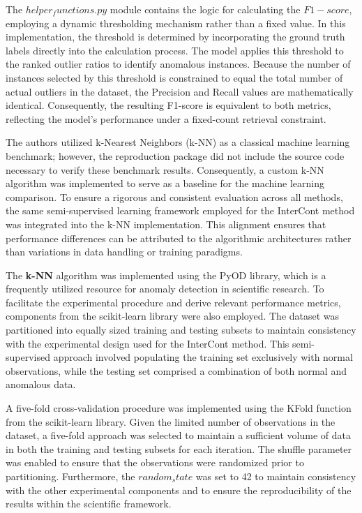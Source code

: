The $helper_functions.py$ module contains the logic for calculating the $F1-score$, employing a dynamic thresholding mechanism rather than a fixed value. 
In this implementation, the threshold is determined by incorporating the ground truth labels directly into the calculation process. 
The model applies this threshold to the ranked outlier ratios to identify anomalous instances. 
Because the number of instances selected by this threshold is constrained to equal the total number of actual outliers in the dataset, the Precision and Recall values are mathematically identical. 
Consequently, the resulting F1-score is equivalent to both metrics, reflecting the model's performance under a fixed-count retrieval constraint.

The authors utilized k-Nearest Neighbors (k-NN) as a classical machine learning benchmark; however, the reproduction package did not include the source code necessary to verify these benchmark results. 
Consequently, a custom k-NN algorithm was implemented to serve as a baseline for the machine learning comparison. 
To ensure a rigorous and consistent evaluation across all methods, the same semi-supervised learning framework employed for the InterCont method was integrated into the k-NN implementation. 
This alignment ensures that performance differences can be attributed to the algorithmic architectures rather than variations in data handling or training paradigms.


The \textbf{k-NN} algorithm was implemented using the PyOD library, which is a frequently utilized resource for anomaly detection in scientific research. 
To facilitate the experimental procedure and derive relevant performance metrics, components from the scikit-learn library were also employed. 
The dataset was partitioned into equally sized training and testing subsets to maintain consistency with the experimental design used for the InterCont method. 
This semi-supervised approach involved populating the training set exclusively with normal observations, while the testing set comprised a combination of both normal and anomalous data.


A five-fold cross-validation procedure was implemented using the KFold function from the scikit-learn library. 
Given the limited number of observations in the dataset, a five-fold approach was selected to maintain a sufficient volume of data in both the training and testing subsets for each iteration. 
The shuffle parameter was enabled to ensure that the observations were randomized prior to partitioning. 
Furthermore, the $random_state$ was set to 42 to maintain consistency with the other experimental components and to ensure the reproducibility of the results within the scientific framework.


